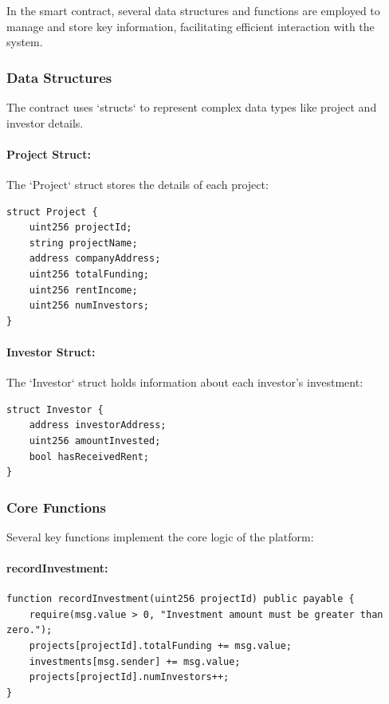 In the smart contract, several data structures and functions are employed to manage and store key information, facilitating efficient interaction with the system.

\subsubsection{Data Structures}

The contract uses `structs` to represent complex data types like project and investor details.

\paragraph{Project Struct:}
The `Project` struct stores the details of each project:
\begin{verbatim}
struct Project {
    uint256 projectId;
    string projectName;
    address companyAddress;
    uint256 totalFunding;
    uint256 rentIncome;
    uint256 numInvestors;
}
\end{verbatim}

\paragraph{Investor Struct:}
The `Investor` struct holds information about each investor's investment:
\begin{verbatim}
struct Investor {
    address investorAddress;
    uint256 amountInvested;
    bool hasReceivedRent;
}
\end{verbatim}

\subsubsection{Core Functions}

Several key functions implement the core logic of the platform:

\paragraph{recordInvestment:}
\begin{verbatim}
function recordInvestment(uint256 projectId) public payable {
    require(msg.value > 0, "Investment amount must be greater than zero.");
    projects[projectId].totalFunding += msg.value;
    investments[msg.sender] += msg.value;
    projects[projectId].numInvestors++;
}
\end{verbatim}

